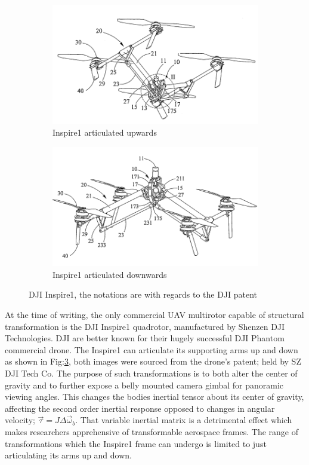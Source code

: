 \begin{figure}[hbtp]
\centering
\begin{subfigure}{.5\textwidth}
\centering
\includegraphics[width=\textwidth]{figs/dji-inspire1}
\caption{Inspire1 articulated upwards}
\label{fig:inspireup}
\end{subfigure}%
\begin{subfigure}{.5\textwidth}
\centering
\includegraphics[width=\textwidth]{figs/dji-inspire2}
\caption{Inspire1 articulated downwards}
\label{fig:inspiredown}
\end{subfigure}
\caption{DJI Inspire1, the notations are with regards to the DJI patent}
\label{fig:inspire1}
\end{figure}
At the time of writing, the only commercial UAV multirotor capable of structural transformation is the DJI Inspire1 quadrotor\cite{inspire}, manufactured by Shenzen DJI Technologies. DJI are better known for their hugely successful DJI Phantom commercial drone\cite{phantom}. The Inspire1 can articulate its supporting arms up and down as shown in Fig:\ref{fig:inspire1}, both images were sourced from the drone's patent; held by SZ DJI Tech Co\cite{djinspire}. The purpose of such transformations is to both alter the center of gravity and to further expose a belly mounted camera gimbal for panoramic viewing angles. This changes the bodies inertial tensor about its center of gravity, affecting the second order inertial response opposed to changes in angular velocity; $\vec{\tau}=J\Delta\vec{\omega}_b$. That variable inertial matrix is a detrimental effect which makes researchers apprehensive of transformable aerospace frames. The range of transformations which the Inspire1 frame can undergo is limited to just articulating its arms up and down.
